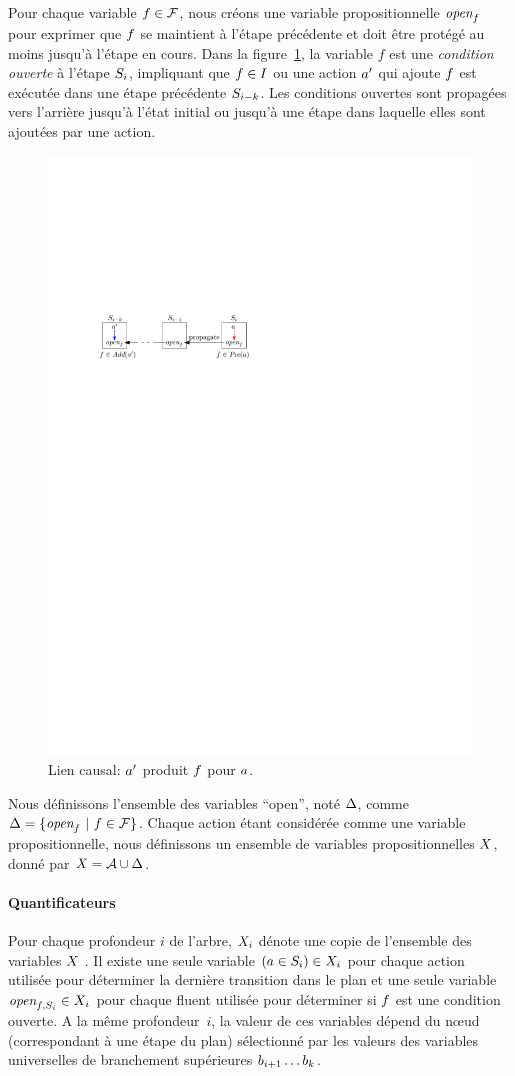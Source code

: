 Pour chaque variable $\f\in\F$, nous créons une variable propositionnelle $\openSingle{\f}$ pour exprimer que $\f$ se maintient à l'étape précédente et doit être protégé au moins jusqu'à l'étape en cours.
Dans la figure~\ref{fig:causal-link-cte}, la variable $f$ est une \textit {condition ouverte} à l'étape $\S_i$, impliquant que $\f\in\I$ ou une action $\b$ qui ajoute $\f$
est exécutée dans une étape précédente $\S_{i-k}$.
Les conditions ouvertes sont propagées vers l'arrière jusqu'à l'état initial ou jusqu'à une étape dans laquelle elles sont ajoutées par une action.


\begin{figure}[hb!]\centering
	\includegraphics[width=.4\textwidth]{figures/transitions}
    \caption{Lien causal: $\b$ produit $\f$ pour $\a$.}
    \label{fig:causal-link-cte}
\end{figure}

Nous définissons l'ensemble des variables \enquote{open}, noté $\openSet$, comme $\openSet = \{\openSingle{\f} ~|~ \f \in \F \}$. Chaque action étant considérée comme une variable propositionnelle, nous définissons un ensemble de variables propositionnelles $\X$, donné par $\X = \A \cup \openSet$.


\paragraph*{Quantificateurs}

Pour chaque profondeur $i$ de l'arbre, $\X_i$ dénote une copie de l'ensemble des variables $\X$ . Il existe une seule variable $\instep{\a}{i}\in X_{i}$ pour chaque action utilisée pour déterminer la dernière transition dans le plan et une seule variable $\openstep{\f}{i}\in X_{i}$ pour chaque fluent utilisée pour déterminer si $\f$ est une condition ouverte. A la même profondeur~$i$, la valeur de ces variables dépend du n\oe ud (correspondant à une étape du plan) sélectionné par les valeurs des variables universelles de branchement supérieures $b_{i+1}\ldots b_{\depth}$.

